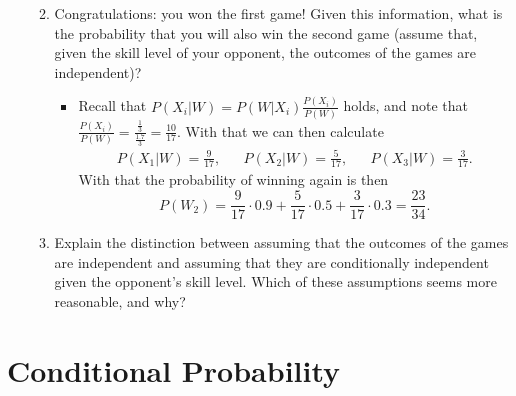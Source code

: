 \documentclass{article}
\begin{document}
\begin{enumerate}
\begin{enumerate}
\begin{itemize}
$$					$$
				\end{itemize}
			\item Congratulations: you won the first game! Given this information, what is the probability that you will also win the second game (assume that, given the skill level of your opponent, the outcomes of the games are independent)?
				\begin{itemize}
					\item Recall that $P(X_i|W) = P(W|X_i) \frac{P(X_i)}{P(W)}$ holds, and note that $\frac{P(X_i)}{P(W)} = \frac{\frac{1}{3}}{\frac{1.7}{3}} = \frac{10}{17}$. With that we can then calculate
					$$
					\begin{aligned}
					P(X_1|W) = \frac{9}{17},&&P(X_2|W) = \frac{5}{17},&&P(X_3|W) = \frac{3}{17}.
					\end{aligned}
					$$
					With that the probability of winning again is then
					$$
					P(W_2) = \frac{9}{17} \cdot 0.9 + \frac{5}{17} \cdot 0.5 + \frac{3}{17} \cdot 0.3 = \frac{23}{34}.
 					$$
				\end{itemize}
			\item Explain the distinction between assuming that the outcomes of the games are independent and assuming that they are conditionally independent given the opponent’s skill level. Which of these assumptions seems more reasonable, and why?
		\end{enumerate}
\end{enumerate}

\section{Conditional Probability}
\end{document}
